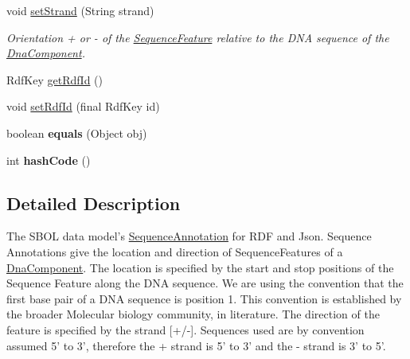 \begin{DoxyCompactItemize}
void \hyperlink{classorg_1_1sbolstandard_1_1lib_s_b_o_lj_1_1_sequence_annotation_a336a936a47073d186cafc97952c0c11a}{setStrand} (String strand)
\begin{DoxyCompactList}\small\item\em Orientation + or -\/ of the \hyperlink{classorg_1_1sbolstandard_1_1lib_s_b_o_lj_1_1_sequence_feature}{SequenceFeature} relative to the DNA sequence of the \hyperlink{classorg_1_1sbolstandard_1_1lib_s_b_o_lj_1_1_dna_component}{DnaComponent}. \item\end{DoxyCompactList}\item 
RdfKey \hyperlink{classorg_1_1sbolstandard_1_1lib_s_b_o_lj_1_1_sequence_annotation_a98d34c30847c78a8922be878a2fa4d49}{getRdfId} ()
\item 
void \hyperlink{classorg_1_1sbolstandard_1_1lib_s_b_o_lj_1_1_sequence_annotation_afe8d2a1ced8871ba217ddf364366da99}{setRdfId} (final RdfKey id)
\item 
\hypertarget{classorg_1_1sbolstandard_1_1lib_s_b_o_lj_1_1_sequence_annotation_ae3ce8ca5a04e8966a9d2158aeeecfc16}{
boolean {\bfseries equals} (Object obj)}
\label{classorg_1_1sbolstandard_1_1lib_s_b_o_lj_1_1_sequence_annotation_ae3ce8ca5a04e8966a9d2158aeeecfc16}

\item 
\hypertarget{classorg_1_1sbolstandard_1_1lib_s_b_o_lj_1_1_sequence_annotation_a077e18fe97323c7194e2665ffc766399}{
int {\bfseries hashCode} ()}
\label{classorg_1_1sbolstandard_1_1lib_s_b_o_lj_1_1_sequence_annotation_a077e18fe97323c7194e2665ffc766399}

\end{DoxyCompactItemize}


\subsection{Detailed Description}
The SBOL data model's \hyperlink{classorg_1_1sbolstandard_1_1lib_s_b_o_lj_1_1_sequence_annotation}{SequenceAnnotation} for RDF and Json. Sequence Annotations give the location and direction of SequenceFeatures of a \hyperlink{classorg_1_1sbolstandard_1_1lib_s_b_o_lj_1_1_dna_component}{DnaComponent}. The location is specified by the start and stop positions of the Sequence Feature along the DNA sequence. We are using the convention that the first base pair of a DNA sequence is position 1. This convention is established by the broader Molecular biology community, in literature. The direction of the feature is specified by the strand \mbox{[}+/-\/\mbox{]}. Sequences used are by convention assumed 5' to 3', therefore the {\ttfamily +} strand is 5' to 3' and the {\ttfamily -\/} strand is 3' to 5'.

